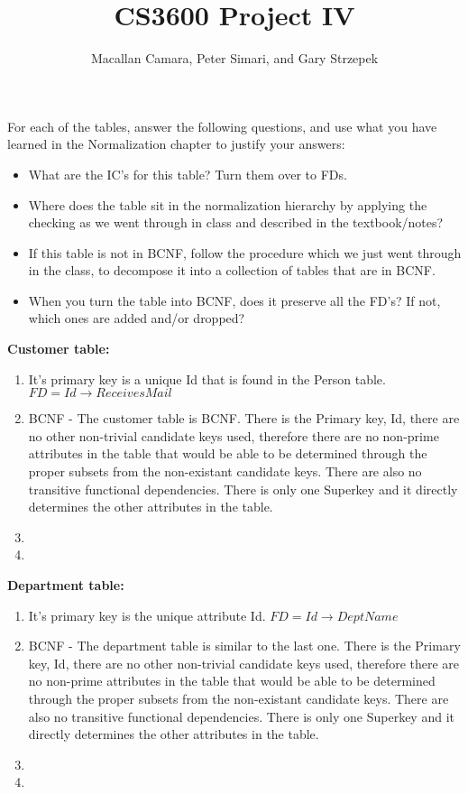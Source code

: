 \documentclass{article}
\title{CS3600 Project IV}
\author{Macallan Camara, Peter Simari, and Gary Strzepek}
\begin{document}
  \maketitle
  \par For each of the tables, answer the following questions, and use what you
  have learned in the Normalization chapter to justify your answers:
  \begin{itemize}
  	\item What are the IC's for this table? Turn them over to FDs.
  	\item Where does the table sit in the normalization hierarchy by applying the
  	checking as we went through in class and described in the textbook/notes?
  	\item If this table is not in BCNF, follow the procedure which we just went
  	through in the class, to decompose it into a collection of tables that are in
  	BCNF.
  	\item When you turn the table into BCNF, does it preserve all the FD's? If
  	not, which ones are added and/or dropped?
  \end{itemize}
  \par\textbf{Customer table:}
  \begin{enumerate}[label=\roman*]
  	\item It's primary key is a unique Id that is found in the Person table. \newline
    $FD = Id \rightarrow ReceivesMail$
  	\item BCNF - The customer table is BCNF. There is the Primary key, Id, there are no other non-trivial candidate keys used, therefore there are no non-prime attributes in the table that would be able to be determined through the proper subsets from the non-existant candidate keys. There are also no transitive functional dependencies. There is only one Superkey and it directly determines the other attributes in the table.
  	\item
  	\item
  \end{enumerate}
  \par\textbf{Department table:}
  \begin{enumerate}[label=\roman*]
  	\item It's primary key is the unique attribute Id. \newline
    $FD = Id \rightarrow DeptName$
  	\item BCNF - The department table is similar to the last one. There is the Primary key, Id, there are no other non-trivial candidate keys used, therefore there are no non-prime attributes in the table that would be able to be determined through the proper subsets from the non-existant candidate keys. There are also no transitive functional dependencies. There is only one Superkey and it directly determines the other attributes in the table.
  	\item
  	\item
  \end{enumerate}
\end{document}
